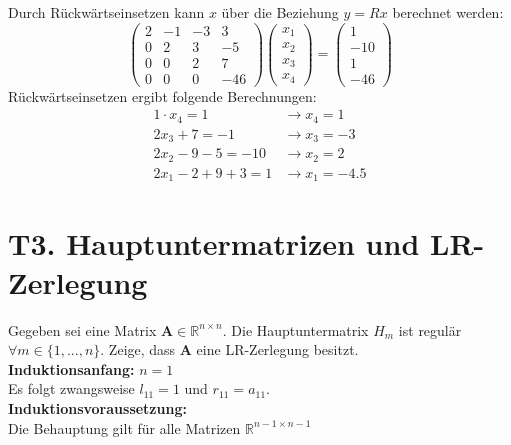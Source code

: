 \documentclass[11pt]{article}
\theoremstyle{plain}
\theoremstyle{definition}
\let\mbb\boldsymbol
\renewcommand\boldsymbol{\mbb}
\renewcommand{\a}{\"{a}}
\renewcommand{\u}{\"{u}}
\begin{document}
\begin{itemize}
Durch R\u ckw\a rtseinsetzen kann $x$ \u ber die Beziehung $y=Rx$ berechnet werden:
\begin{equation}
\begin{pmatrix}
2 & -1 & -3 & 3 \\
0 & 2 & 3 & -5 \\
0 & 0 & 2 & 7 \\
0 & 0 & 0 & -46
\end{pmatrix}
\begin{pmatrix}
x_1 \\ x_2 \\ x_3 \\ x_4
\end{pmatrix}
=
\begin{pmatrix}
1 \\ -10 \\ 1 \\ -46
\end{pmatrix}
\end{equation}
R\u ckw\a rtseinsetzen ergibt folgende Berechnungen:
\begin{align}
1 \cdot x_4 = 1   &\rightarrow x_4 = 1 \\
2x_3 + 7 = -1      &\rightarrow x_3=-3 \\
2x_2-9-5 =-10     &\rightarrow x_2 = 2 \\
2x_1 -2 + 9 +3 = 1 &\rightarrow x_1 = -4.5
\end{align} 
\end{itemize}

\section*{T3. Hauptuntermatrizen und LR-Zerlegung}
Gegeben sei eine Matrix $\mbb{A}\in \mathbb{R}^{n \times n}$. Die Hauptuntermatrix $H_m$ ist regul\a r $\forall m \in \{1,...,n\}$. Zeige, dass $\mbb{A}$ eine LR-Zerlegung besitzt.\\

\textbf{Induktionsanfang:} $n = 1$ \\
Es folgt zwangsweise $l_{11} = 1$ und $r_{11} = a_{11}$.\\

\textbf{Induktionsvoraussetzung:} \\
Die Behauptung gilt f\u r alle Matrizen $\mathbb{R}^{n-1 \times n-1}$\\
\end{document}
